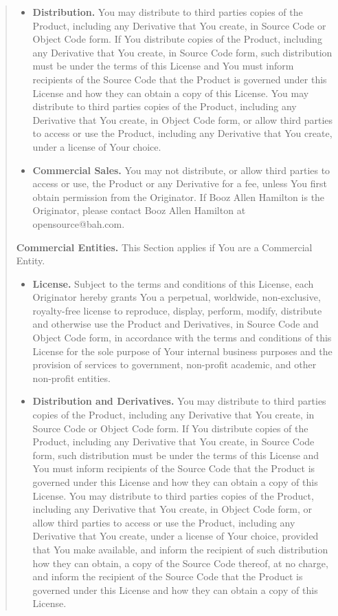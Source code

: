 \documentclass[10pt]{article}
\begin{document}
\begin{enumerate}
\begin{quote}
\begin{itemize}
			\item \textbf{Distribution.} You may distribute to third parties copies of the Product, including any Derivative that You create, in Source Code or Object Code form. If You distribute copies of the Product, including any Derivative that You create, in Source Code form, such distribution must be under the terms of this License and You must inform recipients of the Source Code that the Product is governed under this License and how they can obtain a copy of this License. You may distribute to third parties copies of the Product, including any Derivative that You create, in Object Code form, or allow third parties to access or use the Product, including any Derivative that You create, under a license of Your choice.
		
   			\item \textbf{Commercial Sales.} You may not distribute, or allow third parties to access or use, the Product or any Derivative for a fee, unless You first obtain permission from the Originator. If Booz Allen Hamilton is the Originator, please contact Booz Allen Hamilton at opensource@bah.com.
	\end{itemize}	
	
		\textbf{Commercial Entities.}
		This Section applies if You are a Commercial Entity.
		
		\begin{itemize}
		\item \textbf{License.} Subject to the terms and conditions of this License, each Originator hereby grants You a perpetual, worldwide, non-exclusive, royalty-free license to reproduce, display, perform, modify, distribute and otherwise use the Product and Derivatives, in Source Code and Object Code form, in accordance with the terms and conditions of this License for the sole purpose of Your internal business purposes and the provision of services to government, non-profit academic, and other non-profit entities.
		
		\item \textbf{Distribution and Derivatives.} You may distribute to third parties copies of the Product, including any Derivative that You create, in Source Code or Object Code form. If You distribute copies of the Product, including any Derivative that You create, in Source Code form, such distribution must be under the terms of this License and You must inform recipients of the Source Code that the Product is governed under this License and how they can obtain a copy of this License. You may distribute to third parties copies of the Product, including any Derivative that You create, in Object Code form, or allow third parties to access or use the Product, including any Derivative that You create, under a license of Your choice, provided that You make available, and inform the recipient of such distribution how they can obtain, a copy of the Source Code thereof, at no charge, and inform the recipient of the Source Code that the Product is governed under this License and how they can obtain a copy of this License.
		

\end{itemize}
\end{quote}
\end{enumerate}
\end{document}
